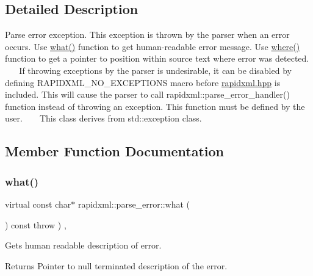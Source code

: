 \subsection{Detailed Description}
Parse error exception. This exception is thrown by the parser when an error occurs. Use \hyperlink{classrapidxml_1_1parse__error_a986003116ebcb49a69a20228da306232}{what()} function to get human-\/readable error message. Use \hyperlink{classrapidxml_1_1parse__error_ab139528f4d9e960f0ee807d22d6c032d}{where()} function to get a pointer to position within source text where error was detected. ~\newline
~\newline
 If throwing exceptions by the parser is undesirable, it can be disabled by defining R\+A\+P\+I\+D\+X\+M\+L\+\_\+\+N\+O\+\_\+\+E\+X\+C\+E\+P\+T\+I\+O\+NS macro before \hyperlink{rapidxml_8hpp}{rapidxml.\+hpp} is included. This will cause the parser to call rapidxml\+::parse\+\_\+error\+\_\+handler() function instead of throwing an exception. This function must be defined by the user. ~\newline
~\newline
 This class derives from {\ttfamily std\+::exception} class. 

\subsection{Member Function Documentation}
\mbox{\label{classrapidxml_1_1parse__error_a986003116ebcb49a69a20228da306232}} 
\subsubsection{\texorpdfstring{what()}{what()}}
{\footnotesize\ttfamily virtual const char$\ast$ rapidxml\+::parse\+\_\+error\+::what (\begin{DoxyParamCaption}{ }\end{DoxyParamCaption}) const throw  ) \hspace{0.3cm}{\ttfamily [inline]}, {\ttfamily [virtual]}}

Gets human readable description of error. \begin{DoxyReturn}{Returns}
Pointer to null terminated description of the error. 
\end{DoxyReturn}
\mbox{\label{classrapidxml_1_1parse__error_ab139528f4d9e960f0ee807d22d6c032d}} 
